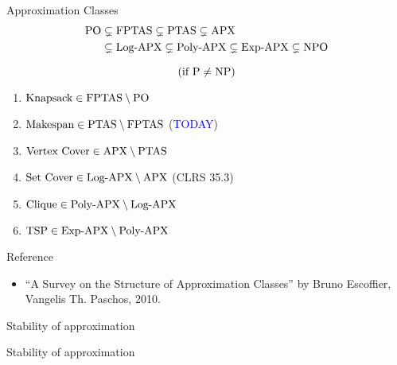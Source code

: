 \begin{frame}{Approximation Classes}
  \begin{align*}
	\text{PO} &\subsetneq \text{FPTAS} \subsetneq \text{PTAS} \subsetneq \text{APX} \\
	&\subsetneq \text{Log-APX} \subsetneq \text{Poly-APX} \subsetneq \text{Exp-APX} \subsetneq \text{NPO}
  \end{align*}

  \vspace{-0.50cm}
  \[
	(\text{if } \text{P}{} \neq \text{NP}{})
  \]

  \begin{enumerate}
	\item $\text{Knapsack} \in \text{FPTAS} \setminus \text{PO}$
	\item $\text{Makespan} \in \text{PTAS} \setminus \text{FPTAS}$ ({\small \textcolor{blue}{TODAY}})
	\item $\text{Vertex Cover} \in \text{APX} \setminus \text{PTAS}$ 
	\item $\text{Set Cover} \in \text{Log-APX} \setminus \text{APX}$ ({\small CLRS 35.3})
	\item $\text{Clique} \in \text{Poly-APX} \setminus \text{Log-APX}$
	\item $\text{TSP} \in \text{Exp-APX} \setminus \text{Poly-APX}$
  \end{enumerate}

  \begin{alertblock}{Reference}
	\begin{itemize}
	  \item ``A Survey on the Structure of Approximation Classes'' by Bruno Escoffier, 	Vangelis Th. Paschos, 2010.
	\end{itemize}
  \end{alertblock}
\end{frame}
\begin{frame}{Stability of approximation}
\end{frame}
\begin{frame}{Stability of approximation}
\end{frame}
